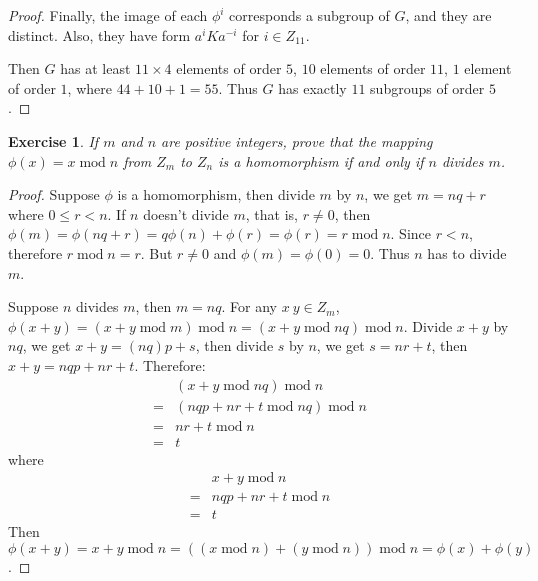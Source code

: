 \documentclass[14pt]{extarticle}
\newtheorem{exercise}{Exercise}[section]
\newcommand{\1}{\{ e \}}
\DeclareMathOperator{\modu}{mod}
\begin{document}
\begin{proof}
  Finally, the image of each $\phi^i$ corresponds a subgroup of $G$,
  and they are distinct. Also, they have form $a^iKa^{-i}$ for $i \in Z_{11}$.

  Then $G$ has at least $11 \times 4$ elements of order $5$,
  $10$ elements of order $11$, $1$ element of order $1$,
  where $44 + 10 + 1 = 55$. Thus $G$ has exactly $11$ subgroups of order $5$.
\end{proof}

\setcounter{exercise}{73}
\begin{exercise}
  If $m$ and $n$ are positive integers, prove that the mapping
  $\phi(x) = x \modu n$ from $Z_m$ to $Z_n$ is a homomorphism
  if and only if $n$ divides $m$.
\end{exercise}
\begin{proof}
  Suppose $\phi$ is a homomorphism, then
  divide $m$ by $n$, we get $m = nq + r$ where $0 \le r < n$.
  If $n$ doesn't divide $m$, that is, $r \neq 0$,
  then $\phi(m) = \phi(nq + r) = q\phi(n) + \phi(r) = \phi(r) = r \modu n$.
  Since $r < n$, therefore $r \modu n = r$. But $r \neq 0$ and $\phi(m) = \phi(0) = 0$.
  Thus $n$ has to divide $m$.

  Suppose $n$ divides $m$, then $m = nq$.
  For any $x \ y \in Z_m$,
  $\phi(x + y) = (x + y \modu m) \modu n = (x + y \modu nq) \modu n$.
  Divide $x + y$ by $nq$, we get $x + y = (nq)p + s$,
  then divide $s$ by $n$, we get $s = nr + t$,
  then $x + y = nqp + nr + t$. Therefore:
  \begin{align*}
     & (x + y \modu nq) \modu n \\
    =& (nqp + nr + t \modu nq) \modu n \\
    =& nr + t \modu n \\
    =& t
  \end{align*}
  where
  \begin{align*}
     & x + y \modu n \\
    =& nqp + nr + t \modu n \\
    =& t
  \end{align*}
  Then $\phi(x + y) = x + y \modu n = ((x \modu n) + (y \modu n)) \modu n = \phi(x) + \phi(y)$.
\end{proof}
\end{document}
